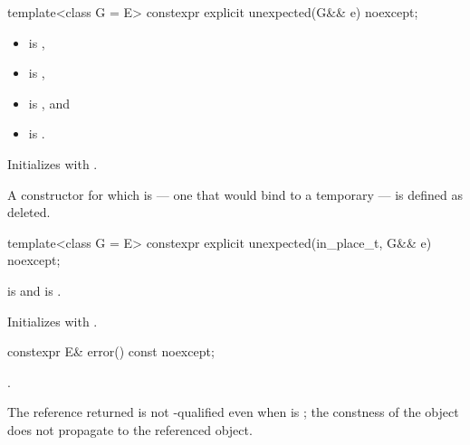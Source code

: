 %
\begin{itemdecl}
template<class G = E> constexpr explicit unexpected(G&& e) noexcept;
\end{itemdecl}

\begin{itemdescr}
\pnum
\constraints
\begin{itemize}
\item {} is ,
\item {} is ,
\item {} is , and
\item {} is .
\end{itemize}

\pnum
\effects
Initializes  with .

\pnum
\remarks
A constructor for which  is  — one that would bind  to a temporary — is defined as deleted.
\end{itemdescr}

%
\begin{itemdecl}
template<class G = E> constexpr explicit unexpected(in_place_t, G&& e) noexcept;
\end{itemdecl}

\begin{itemdescr}
\pnum
\constraints
{} is  and  is .

\pnum
\effects
Initializes  with .
\end{itemdescr}

%
\begin{itemdecl}
constexpr E& error() const noexcept;
\end{itemdecl}

\begin{itemdescr}
\pnum
\returns
{}.

\pnum
\remarks
The reference returned is not -qualified even when  is ; the constness of the  object does not propagate to the referenced object.
\end{itemdescr}

